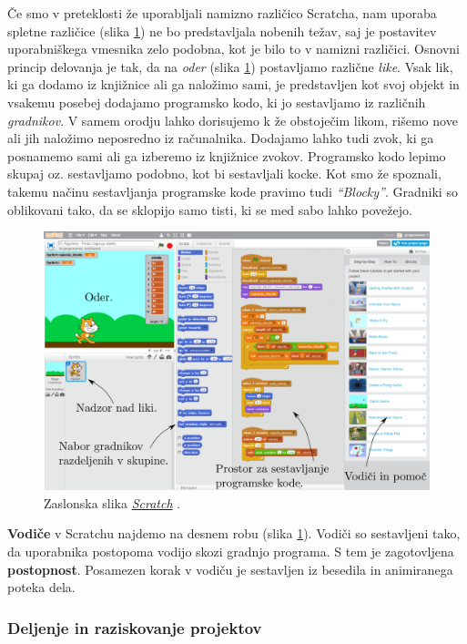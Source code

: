 Če smo v preteklosti že uporabljali namizno različico Scratcha, nam
uporaba spletne različice (slika \ref{fig:web:scratch:orodje}) ne bo
predstavljala nobenih težav, saj je postavitev uporabniškega vmesnika
zelo podobna, kot je bilo to v namizni različici. Osnovni princip
delovanja je tak, da na \emph{oder} (slika
\ref{fig:web:scratch:orodje}) postavljamo različne \emph{like}. Vsak
lik, ki ga dodamo iz knjižnice ali ga naložimo sami, je predstavljen
kot svoj objekt in vsakemu posebej dodajamo programsko kodo, ki jo
sestavljamo iz različnih \emph{gradnikov}. V samem orodju lahko
dorisujemo k že obstoječim likom, rišemo nove ali jih naložimo
neposredno iz računalnika. Dodajamo lahko tudi zvok, ki ga posnamemo
sami ali ga izberemo iz knjižnice zvokov. Programsko kodo lepimo
skupaj oz. sestavljamo podobno, kot bi sestavljali kocke. Kot smo že
spoznali, takemu načinu sestavljanja programske kode pravimo tudi
\emph{``Blocky''}. Gradniki so oblikovani tako, da se sklopijo samo
tisti, ki se med sabo lahko povežejo.

\begin{figure}[h!]
  \centering
    \includegraphics [width=0.90\linewidth, keepaspectratio =
   1] {./images/sc_web/scratch_orodje-v021.jpg}
   \caption{Zaslonska slika
     \emph{\href{https://scratch.mit.edu/}{Scratch}}
     \cite{web:scratch}.}
    \label{fig:web:scratch:orodje}
\end{figure}

\textbf{Vodiče} v Scratchu najdemo na desnem robu (slika
\ref{fig:web:scratch:orodje}). Vodiči so sestavljeni tako, da
uporabnika postopoma vodijo skozi gradnjo programa. S tem je
zagotovljena \textbf{postopnost}. Posamezen korak v vodiču je
sestavljen iz besedila in animiranega poteka dela.

\subsubsection{Deljenje in raziskovanje projektov}
\label{sec:deljenje_vsebin}

